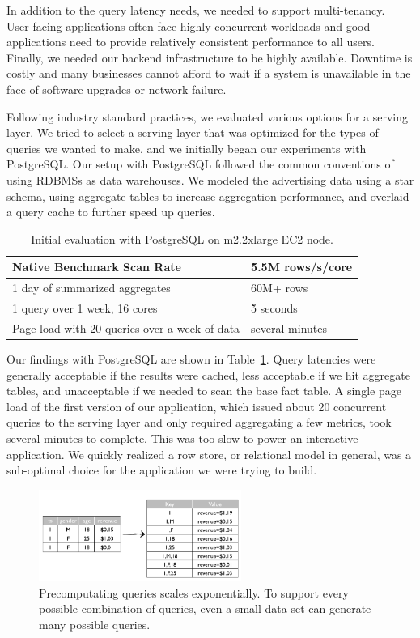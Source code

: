 \documentclass{vldb}
\begin{document}
In addition to the query latency needs, we needed to support multi-tenancy.
User-facing applications often face highly concurrent workloads and good
applications need to provide relatively consistent performance to all users.
Finally, we needed our backend infrastructure to be highly available. Downtime
is costly and many businesses cannot afford to wait if a system is unavailable
in the face of software upgrades or network failure.

Following industry standard practices, we evaluated various options for a
serving layer. We tried to select a serving layer that was optimized for the
types of queries we wanted to make, and we initially began our experiments with
PostgreSQL\cite{stonebraker1987extendability}. Our setup with PostgreSQL
followed the common conventions of using RDBMSs as data warehouses. We modeled
the advertising data using a star schema, using aggregate tables to
increase aggregation performance, and overlaid a query cache to further speed up
queries.

\begin{table}
\centering
\scriptsize\begin{tabular}{| l | l |}
  \hline
  Native Benchmark Scan Rate & \~5.5M rows/s/core \\ \hline
  1 day of summarized aggregates & 60M+ rows \\ \hline
  1 query over 1 week, 16 cores & \~5 seconds \\ \hline
  Page load with 20 queries over a week of data & several minutes \\ \hline
\end{tabular}
\normalsize
\caption{Initial evaluation with PostgreSQL on m2.2xlarge EC2 node.}
\label{tab:postgres_results}
\end{table}

Our findings with PostgreSQL are shown in Table~\ref{tab:postgres_results}.
Query latencies were generally acceptable if the results were cached, less
acceptable if we hit aggregate tables, and unacceptable if we needed to scan
the base fact table. A single page load of the first version of our
application, which issued about 20 concurrent queries to the serving layer and
only required aggregating a few metrics, took several minutes to complete. This
was too slow to power an interactive application. We quickly realized a row
store, or relational model in general, was a sub-optimal choice for the
application we were trying to build.

\begin{figure}
\centering
\includegraphics[width = 2.6in]{precompute}
\caption{Precomputating queries scales exponentially. To support every possible
combination of queries, even a small data set can generate many possible
queries.
}
\label{fig:precompute}
\end{figure}
\end{document}
